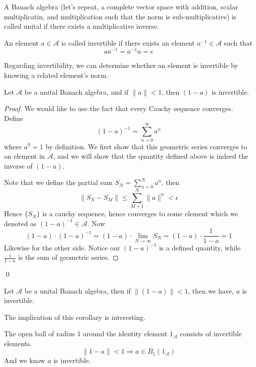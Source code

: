 \begin{definition} 
    A Banach algebra (let's repeat, a complete vector space with addition, scalar multiplicatin, and multiplication such that the norm is sub-multiplicative) is called unital if there exists a multiplicative inverse.

    An element $a\in\mathcal{A}$ is called invertible if there exists an element $a^{-1}\in\mathcal{A}$ such that
    \begin{equation*}
        aa^{-1}=a^{-1}a=e
    \end{equation*}
\end{definition}
Regarding invertibility, we can determine whether an element is invertible by knowing a related element's norm.
\begin{proposition}
    Let $\mathcal{A}$ be a unital Banach algebra, and if $\|a\|<1$, then $(1-a)$ is invertible.
\end{proposition}
\begin{proof}
We would like to use the fact that every Cauchy sequence converges. Define
\begin{equation*}
    (1-a)^{-1}=\sum_{n=0}^\infty a^n
\end{equation*}
where $a^0=1$ by definition. We first show that this geometric series converges to an element in $\mathcal{A}$, and we will show that the quantity defined above is indeed the inverse of $(1-a)$.

Note that we define the partial sum $S_N=\sum_{n=0}^Na^n$, then
\begin{equation*}
    \|S_N-S_M\|\leq\sum_{M+1}^N\|a\|^n<\epsilon
\end{equation*}
Hence $\{S_N\}$ is a cauchy sequence, hence converges to some element which we denoted as $(1-a)^{-1}\in\mathcal{A}$. Now
\begin{equation*}
    (1-a)\cdot (1-a)^{-1}=(1-a)\cdot\lim_{N\to\infty}S_N=(1-a)\cdot\frac{1}{1-a}=1
\end{equation*}
Likewise for the other side. Notice our $(1-a)^{-1}$ is a defined quantity, while $\frac{1}{1-a}$ is the sum of geometric series.
\end{proof}
\qed

\begin{corollary}
    Let $\mathcal{A}$ be a unital Banach algebra, then if $\|(1-a)\|<1$, then we have, $a$ is invertible.
\end{corollary}

The implication of this corollary is interesting.
\begin{corollary} 
    The open ball of radius 1 around the identity element $1_\mathcal{A}$ consists of invertible elements.
\begin{equation*}
    \|1-a\|<1 \Rightarrow a\in B_1(1_\mathcal{A})
\end{equation*}
And we know $a$ is invertible.
\end{corollary}


